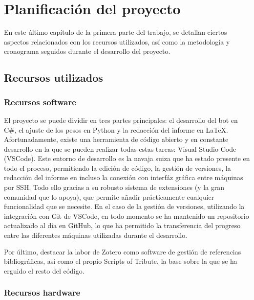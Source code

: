 \chapter{Planificación del proyecto} \label{chap:planificacion}

En este último capítulo de la primera parte del trabajo, se detallan ciertos aspectos relacionados con los recursos utilizados, así como la metodología y cronograma seguidos durante el desarrollo del proyecto.

\section{Recursos utilizados} \label{sec:recursos_utilizados}

\subsection{Recursos software} \label{sec:recursos_software}

El proyecto se puede dividir en tres partes principales: el desarrollo del bot en C\#, el ajuste de los pesos en Python y la redacción del informe en LaTeX. Afortunadamente, existe una herramienta de código abierto y en constante desarrollo en la que se pueden realizar todas estas tareas: Visual Studio Code (VSCode). Este entorno de desarrollo es la navaja suiza que ha estado presente en todo el proceso, permitiendo la edición de código, la gestión de versiones, la redacción del informe en incluso la conexión con interfáz gráfica entre máquinas por SSH. Todo ello gracias a su robusto sistema de extensiones (y la gran comunidad que lo apoya), que permite añadir prácticamente cualquier funcionalidad que se necesite. En el caso de la gestión de versiones, utilizando la integración con Git de VSCode, en todo momento se ha mantenido un repositorio actualizado al día en GitHub, lo que ha permitido la transferencia del progreso entre las diferentes máquinas utilizadas durante el desarrollo.

Por último, destacar la labor de Zotero como software de gestión de referencias bibliográficas, así como el propio Scripts of Tribute, la base sobre la que se ha erguido el resto del código.

\subsection{Recursos hardware} \label{sec:recursos_hardware}

